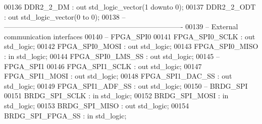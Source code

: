 \begin{DoxyCode}
00136       \textcolor{vhdlchar}{DDR2_2_DM}         \textcolor{vhdlchar}{:} \textcolor{keywordflow}{out}    \textcolor{comment}{std\_logic\_vector}\textcolor{vhdlchar}{(}\textcolor{vhdllogic}{}\textcolor{vhdllogic}{1} \textcolor{keywordflow}{downto} \textcolor{vhdllogic}{}\textcolor{vhdllogic}{0}\textcolor{vhdlchar}{)};
00137       \textcolor{vhdlchar}{DDR2_2_ODT}        \textcolor{vhdlchar}{:} \textcolor{keywordflow}{out}    \textcolor{comment}{std\_logic\_vector}\textcolor{vhdlchar}{(}\textcolor{vhdllogic}{}\textcolor{vhdllogic}{0} \textcolor{keywordflow}{to} \textcolor{vhdllogic}{}\textcolor{vhdllogic}{0}\textcolor{vhdlchar}{)};         
00138 \textcolor{keyword}{      -- ----------------------------------------------------------------------------}
00139 \textcolor{keyword}{      -- External communication interfaces}
00140 \textcolor{keyword}{         -- FPGA\_SPI0}
00141       \textcolor{vhdlchar}{FPGA_SPI0_SCLK}    \textcolor{vhdlchar}{:} \textcolor{keywordflow}{out}    \textcolor{comment}{std\_logic};
00142       \textcolor{vhdlchar}{FPGA_SPI0_MOSI}    \textcolor{vhdlchar}{:} \textcolor{keywordflow}{out}    \textcolor{comment}{std\_logic};
00143       \textcolor{vhdlchar}{FPGA_SPI0_MISO}    \textcolor{vhdlchar}{:} \textcolor{keywordflow}{in}     \textcolor{comment}{std\_logic};      
00144       \textcolor{vhdlchar}{FPGA_SPI0_LMS_SS}  \textcolor{vhdlchar}{:} \textcolor{keywordflow}{out}    \textcolor{comment}{std\_logic};
00145 \textcolor{keyword}{         -- FPGA\_SPI1}
00146       \textcolor{vhdlchar}{FPGA_SPI1_SCLK}    \textcolor{vhdlchar}{:} \textcolor{keywordflow}{out}    \textcolor{comment}{std\_logic};
00147       \textcolor{vhdlchar}{FPGA_SPI1_MOSI}    \textcolor{vhdlchar}{:} \textcolor{keywordflow}{out}    \textcolor{comment}{std\_logic};
00148       \textcolor{vhdlchar}{FPGA_SPI1_DAC_SS}  \textcolor{vhdlchar}{:} \textcolor{keywordflow}{out}    \textcolor{comment}{std\_logic};
00149       \textcolor{vhdlchar}{FPGA_SPI1_ADF_SS}  \textcolor{vhdlchar}{:} \textcolor{keywordflow}{out}    \textcolor{comment}{std\_logic};
00150 \textcolor{keyword}{         -- BRDG\_SPI}
00151       \textcolor{vhdlchar}{BRDG_SPI_SCLK}     \textcolor{vhdlchar}{:} \textcolor{keywordflow}{in}     \textcolor{comment}{std\_logic};
00152       \textcolor{vhdlchar}{BRDG_SPI_MOSI}     \textcolor{vhdlchar}{:} \textcolor{keywordflow}{in}     \textcolor{comment}{std\_logic};
00153       \textcolor{vhdlchar}{BRDG_SPI_MISO}     \textcolor{vhdlchar}{:} \textcolor{keywordflow}{out}    \textcolor{comment}{std\_logic};
00154       \textcolor{vhdlchar}{BRDG_SPI_FPGA_SS}  \textcolor{vhdlchar}{:} \textcolor{keywordflow}{in}     \textcolor{comment}{std\_logic};

\end{DoxyCode}
